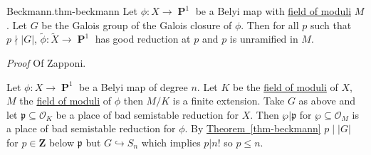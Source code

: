 \documentclass[10pt,]{book}
\makeatletter
\renewcommand*{\proofname}{Proof}
\renewenvironment{proof}[1][\proofname]{\par
  \pushQED{\qed}%
  \normalfont \topsep6\p@\@plus6\p@\relax
  \trivlist
  \item\relax
    {\itshape
    #1\@addpunct{.}}\hspace\labelsep\ignorespaces
}{%
  \popQED\endtrivlist\@endpefalse
}
\numberwithin{equation}{section}
\newcommand{\ideal}[1]{\mathfrak{#1}}
\newcommand{\ZZ}{\mathbf{Z}}
\newcommand{\ints}{\mathcal{O}}
\DeclareMathOperator{\PP}{\mathbf{P}}
\makeatother
\begin{document}
\begin{theorem}{Beckmann.}{}{thm-beckmann}%
\hypertarget{p-745}{}%
Let \(\phi \colon X \to \PP^1\) be a Belyi map with \hyperref[def-field-of-moduli]{field of moduli} \(M\). Let \(G\) be the Galois group of the Galois closure of \(\phi\). Then for all \(p\) such that \(p \nmid |G|\), \(\tilde \phi \colon \tilde X \to \PP^1\) has good reduction at \(p\) and \(p\) is unramified in \(M\).%
\end{theorem}
\begin{proof}\hypertarget{proof-101}{}
\hypertarget{p-746}{}%
Of Zapponi.%
\par
\hypertarget{p-747}{}%
Let \(\phi\colon X \to \PP^1\) be a Belyi map of degree \(n\). Let \(K\) be the \hyperref[def-field-of-moduli]{field of moduli} of \(X\), \(M\) the \hyperref[def-field-of-moduli]{field of moduli} of \(\phi\) then \(M/K\) is a finite extension. Take \(G\) as above and let \(\ideal p \subseteq \ints_K\) be a place of bad semistable reduction for \(X\). Then \(\wp| \ideal p\) for \(\wp \subseteq \ints_M\) is a place of bad semistable reduction for \(\phi\). By \hyperref[thm-beckmann]{Theorem~\ref{thm-beckmann}} \(p \mid |G|\) for \(p\in \ZZ\) below \(\ideal p\) but \(G \hookrightarrow S_n\) which implies \(p|n!\) so \(p\le n\).%
\end{proof}
%
%
\typeout{************************************************}
\typeout{************************************************}
%
\end{document}
